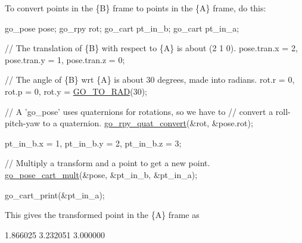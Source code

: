 To convert points in the \{B\} frame to points in the \{A\} frame, do this\-: 
\begin{DoxyCode}
go\_pose pose;
go\_rpy rot;
go\_cart pt\_in\_b;
go\_cart pt\_in\_a;

\textcolor{comment}{// The translation of \{B\} with respect to \{A\} is about (2 1 0).}
pose.tran.x = 2, pose.tran.y = 1, pose.tran.z = 0;

\textcolor{comment}{// The angle of \{B\} wrt \{A\} is about 30 degrees, made into radians.}
rot.r = 0, rot.p = 0, rot.y = \hyperlink{gomath_8h_a257fd1bdbb4294c1bf1d2c34bfeaba42}{GO\_TO\_RAD}(30);

\textcolor{comment}{// A 'go\_pose' uses quaternions for rotations, so we have to}
\textcolor{comment}{// convert a roll-pitch-yaw to a quaternion.}
\hyperlink{namespacegomotion_a220f82039af859bfd9413107e7fbdf13}{go\_rpy\_quat\_convert}(&rot, &pose.rot);

pt\_in\_b.x = 1, pt\_in\_b.y = 2, pt\_in\_b.z = 3;

\textcolor{comment}{// Multiply a transform and a point to get a new point.}
\hyperlink{namespacegomotion_a8fddcbebee69b64a2536721c33087e3c}{go\_pose\_cart\_mult}(&pose, &pt\_in\_b, &pt\_in\_a);

go\_cart\_print(&pt\_in\_a);
\end{DoxyCode}
 This gives the transformed point in the \{A\} frame as 
\begin{DoxyCode}
1.866025 3.232051 3.000000
\end{DoxyCode}
 